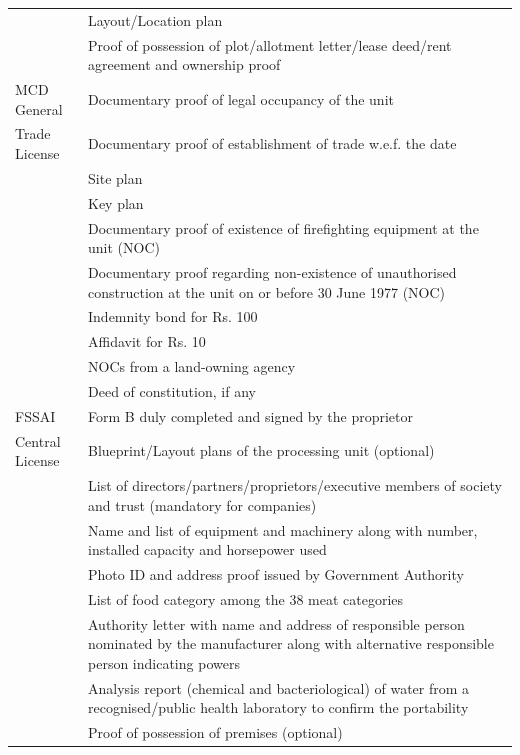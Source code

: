 \documentclass[a4paper, 12pt]{article}
\newcommand\tabitem{\makebox[1em][r]{\textbullet~}}
\begin{document}
\begin{longtable}{>{\raggedright}p{2.5cm}>{\raggedright\arraybackslash}p{13cm}}
          & \tabitem Layout/Location plan \\
          & \tabitem Proof of possession of plot/allotment letter/lease deed/rent agreement and ownership proof  \\
    \midrule
    MCD General & \tabitem Documentary proof of legal occupancy of the unit \\
    Trade License & \tabitem Documentary proof of establishment of trade w.e.f. the date \\
    & \tabitem Site plan \\
    & \tabitem Key plan \\
          & \tabitem Documentary proof of existence of firefighting equipment at the unit (NOC) \\
          & \tabitem Documentary proof regarding non-existence of unauthorised construction at the unit on or before 30 June 1977 (NOC) \\
          & \tabitem Indemnity bond for Rs. 100 \\
          & \tabitem Affidavit for Rs. 10  \\
          & \tabitem NOCs from a land-owning agency  \\
          & \tabitem Deed of constitution, if any \\
    \midrule
    FSSAI & \tabitem Form B duly completed and signed by the proprietor \\
    Central License & \tabitem Blueprint/Layout plans of the processing unit (optional) \\
    & \tabitem List of directors/partners/proprietors/executive members of society and trust (mandatory for companies) \\
          & \tabitem Name and list of equipment and machinery along with number, installed capacity and horsepower used \\
          & \tabitem Photo ID and address proof issued by Government Authority \\
          & \tabitem List of food category among the 38 meat categories \\
          & \tabitem Authority letter with name and address of responsible person nominated by the manufacturer along with alternative responsible person indicating powers   \\
          & \tabitem Analysis report (chemical and bacteriological) of water from a recognised/public health laboratory to confirm the portability \\
          & \tabitem Proof of possession of premises (optional) \\

\end{longtable}
\end{document}

